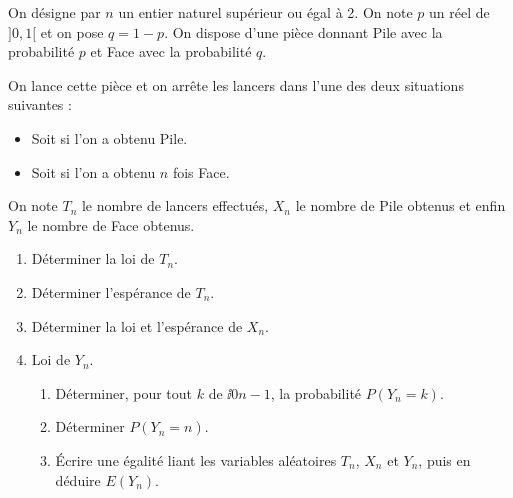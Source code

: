 \documentclass[a4paper,twoside,french,11pt]{VcCours}
\begin{document}
\begin{Exercice}{} On désigne par $n$ un entier naturel supérieur ou égal à 2. On note $p$ un réel de $]0,1[$ et on pose $q = 1-p$. On dispose d'une pièce donnant Pile avec la probabilité $p$ et Face avec la probabilité $q$.

On lance cette pièce et on arrête les lancers dans l'une des deux situations suivantes :
\begin{itemize}
 \item Soit si l'on a obtenu Pile.
 \item Soit si l'on a obtenu $n$ fois Face.
\end{itemize}
%

On note $T_n$ le nombre de lancers effectués, $X_n$ le nombre de Pile obtenus et enfin $Y_n$ le nombre de Face obtenus. 
\begin{enumerate}
 \item  Déterminer la loi de $T_n$.
 \item  Déterminer l'espérance de $T_n$.
 \item Déterminer la loi et l'espérance de $X_n$.
 \item Loi de $Y_n$.
 \begin{enumerate}
  \item Déterminer, pour tout $k$ de $\ii{0}{n-1}$, la probabilité $P(Y_n = k)$.
  \item Déterminer $P(Y_n = n)$.
  \item Écrire une égalité liant les variables aléatoires $T_n$, $X_n$ et $Y_n$, puis en déduire $E(Y_n)$.
\end{enumerate}
\end{enumerate}
\end{Exercice}
\end{document}
